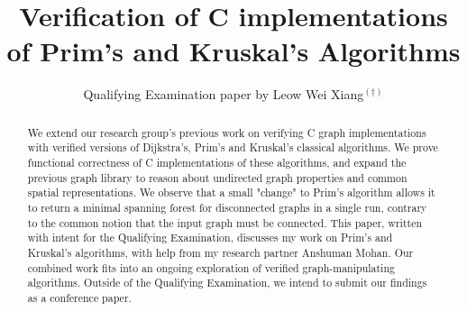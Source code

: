\documentclass[12pt]{llncs}
\title{Verification of C implementations of Prim's and Kruskal's Algorithms}
\subtitle{}
\begin{document}
\author{Qualifying Examination paper by Leow Wei Xiang$^{(\dagger)}$}

%

\maketitle








\begin{abstract}
	\vspace{-1.2em}
	We extend our research group's previous work on verifying C graph implementations
	with verified versions of Dijkstra's, Prim's and Kruskal's classical algorithms.
	We prove functional correctness of C implementations of these algorithms, and expand the previous graph library to reason about undirected graph properties and common spatial representations.
	We observe that a small "change" to Prim's algorithm allows it to return a minimal spanning forest for disconnected graphs in a single run, contrary to the common notion that the input graph must be connected.
	\newline\newline
	This paper, written with intent for the Qualifying Examination, discusses my work on Prim's and Kruskal's algorithms,
	with help from my research partner Anshuman Mohan. Our combined work fits
	into an ongoing exploration of verified graph-manipulating algorithms.
	Outside of the Qualifying Examination, we intend to submit our findings as a conference paper.
	
\end{abstract} %
\end{document}
